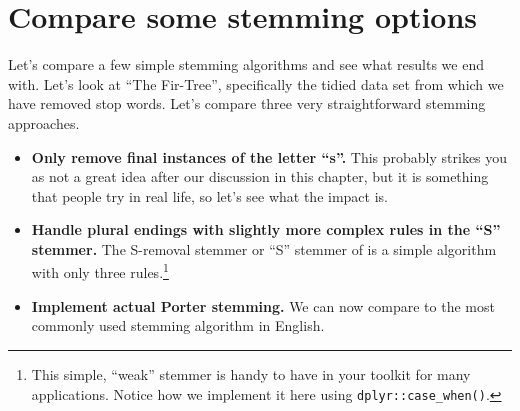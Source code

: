 \documentclass[
]{krantz}
\begin{document}
\hypertarget{compare-some-stemming-options}{%
\section{Compare some stemming options}\label{compare-some-stemming-options}}

Let's compare a few simple stemming algorithms and see what results we end with. Let's look at ``The Fir-Tree'', specifically the tidied data set from which we have removed stop words. Let's compare three very straightforward stemming approaches.

\begin{itemize}
\item
  \textbf{Only remove final instances of the letter ``s''.} This probably strikes you as not a great idea after our discussion in this chapter, but it is something that people try in real life, so let's see what the impact is.
\item
  \textbf{Handle plural endings with slightly more complex rules in the ``S'' stemmer.} The S-removal stemmer or ``S'' stemmer of \citet{Harman91} is a simple algorithm with only three rules.\footnote{This simple, ``weak'' stemmer is handy to have in your toolkit for many applications. Notice how we implement it here using \texttt{dplyr::case\_when()}.}
\item
  \textbf{Implement actual Porter stemming.} We can now compare to the most commonly used stemming algorithm in English.
\end{itemize}
\end{document}
